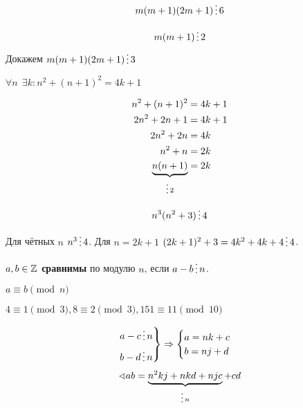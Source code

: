 \begin{exercise*}
    \[m(m + 1)(2m + 1) \divided 6\]
\end{exercise*}
\begin{solution}
    \[m(m + 1) \divided 2\]
    Докажем \(m(m + 1)(2m + 1) \divided 3\)
    \begin{caseof}
    \end{caseof}
\end{solution}

\begin{exercise*}
    \(\forall n \ \ \exists k : n^2 + (n + 1)^2 = 4k + 1\)
\end{exercise*}
\begin{solution}
    \begin{align*}
        n^2 + (n + 1)^2                    & = 4k + 1 \\
        2n^2 + 2n + 1                      & = 4k + 1 \\
        2n^2 + 2n                          & = 4k     \\
        n^2 + n                            & = 2k     \\
        \underbrace{n(n + 1)}_{\divided 2} & = 2k     \\
    \end{align*}
\end{solution}

\begin{exercise*}
    \[n^3(n^2 + 3) \divided 4\]
\end{exercise*}
\begin{solution}
    Для чётных \(n\) \(n^3 \divided 4\). Для \(n = 2k + 1\) \((2k + 1)^2 + 3 = 4k^2 + 4k + 4 \divided 4\).
\end{solution}

\begin{definition}
    \(a, b \in \mathbb{Z}\) \textbf{сравнимы} по модулю \(n\), если \(a - b \divided n\).
\end{definition}
\begin{obozn}
    \(a \equiv b \pmod n\)
\end{obozn}
\begin{example}
    \(4 \equiv 1 \pmod 3, 8 \equiv 2 \pmod 3, 151 \equiv 11 \pmod{10}\)
\end{example}

\[\begin{rcases}
        a - c \divided n \\
        b - d \divided n
    \end{rcases} \Rightarrow \begin{cases}
        a = nk + c \\
        b = nj + d
    \end{cases}\]
\[\sphericalangle ab = \underbrace{n^2 kj + nkd + njc}_{\divided n} + cd\]

